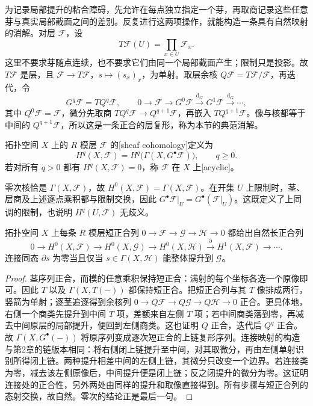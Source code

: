 为记录局部提升的粘合障碍，先允许在每点独立指定一个芽，再取商记录这些任意芽与真实局部截面之间的差别。反复进行这两项操作，就能构造一条具有自然映射的消解。对层 \(\mathcal F\)，设
\[
	T\mathcal F(U)=\prod_{x\in U}\mathcal F_x.
\]
这里不要求芽随点连续，也不要求它们由同一个局部截面产生；限制只是投影。故 \(T\mathcal F\) 是层，且 \(\mathcal F\to T\mathcal F\)，\(s\mapsto(s_x)_x\)，为单射。取层余核 \(Q\mathcal F=T\mathcal F/\mathcal F\)，再迭代，令
\begin{equation}\label{g2:eq:canonical-sheaf-resolution}
	G^q\mathcal F=TQ^q\mathcal F,\qquad
	0\longrightarrow\mathcal F\longrightarrow G^0\mathcal F\xrightarrow{\mathrm d_G}G^1\mathcal F\xrightarrow{\mathrm d_G}\cdots,
\end{equation}
其中 \(Q^0\mathcal F=\mathcal F\)，微分先取商 \(TQ^q\mathcal F\to Q^{q+1}\mathcal F\)，再嵌入 \(TQ^{q+1}\mathcal F\)。像与核都等于中间的 \(Q^{q+1}\mathcal F\)，所以这是一条正合的层复形，称为本节的典范消解。

\begin{definition}\label{g2:def:sheaf-cohomology}
	拓扑空间 \(X\) 上的 \(R\) 模层 \(\mathcal F\) 的[sheaf cohomology]定义为
	\[
		H^q(X,\mathcal F)=H^q\bigl(\Gamma(X,G^\bullet\mathcal F)\bigr),\qquad q\ge0.
	\]
	若对所有 \(q>0\) 都有 \(H^q(X,\mathcal F)=0\)，称 \(\mathcal F\) 在 \(X\) 上[acyclic]。
\end{definition}

零次核恰是 \(\Gamma(X,\mathcal F)\)，故 \(H^0(X,\mathcal F)=\Gamma(X,\mathcal F)\)。在开集 \(U\) 上限制时，茎、层商及上述逐点乘积都与限制交换，因此 \(G^\bullet\mathcal F|_U=G^\bullet(\mathcal F|_U)\)。这既定义了上同调的限制，也说明 \(H^q(U,\mathcal F)\) 无歧义。

\begin{proposition}\label{g2:prop:sheaf-long-exact}
	拓扑空间 \(X\) 上每条 \(R\) 模层短正合列 \(0\to\mathcal F\to\mathcal G\to\mathcal H\to0\) 都给出自然长正合列
	\[
		0\to H^0(X,\mathcal F)\to H^0(X,\mathcal G)\to H^0(X,\mathcal H)
		\xrightarrow{\partial}H^1(X,\mathcal F)\to\cdots.
	\]
	连接同态 \(\partial s\) 为零当且仅当 \(s\in\Gamma(X,\mathcal H)\) 能整体提升到 \(\mathcal G\)。
\end{proposition}
\begin{proof}
	茎序列正合，而模的任意乘积保持短正合：满射的每个坐标各选一个原像即可。因此 \(T\) 以及 \(\Gamma(X,T(-))\) 都保持短正合。把短正合列与其 \(T\) 像排成两行，竖箭为单射；逐茎追逐得到余核列 \(0\to Q\mathcal F\to Q\mathcal G\to Q\mathcal H\to0\) 正合。更具体地，右侧一个商类先提升到中间 \(T\) 项，差额来自左侧 \(T\) 项；若中间商类落到零，再减去中间原层的局部提升，便回到左侧商类。这也证明 \(Q\) 正合，迭代后 \(Q^q\) 正合。
	故 \(\Gamma(X,G^\bullet(-))\) 将原序列变成逐次短正合的上链复形序列。连接映射的构造与第2章的链版本相同：将右侧闭上链提升至中间，对其取微分，再由左侧单射识别所得闭上链。两种提升相差中间的左侧上链，其微分只改变一个边界。若连接类为零，减去该左侧原像后，中间提升便是闭上链；反之闭提升的微分为零。这证明连接处的正合性，另外两处由同样的提升和取像直接得到。所有步骤与短正合列的态射交换，故自然。零次的结论正是最后一句。
\end{proof}

